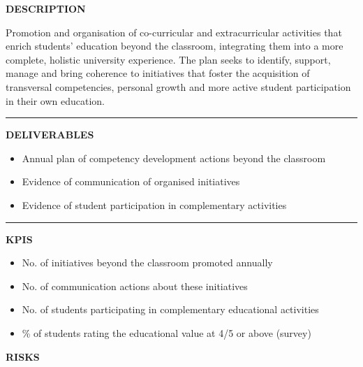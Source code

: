 \documentclass[11pt,a4paper]{scrreprt}
\newcommand{\fieldlabel}[1]{%
  {\footnotesize\sffamily\bfseries\color{mutedcolor}\MakeUppercase{#1}}\par\nopagebreak[4]
}
\newcommand{\fieldsep}{\vspace{3pt}\noindent\textcolor{bordercolor}{\rule{\linewidth}{0.4pt}}\vspace{3pt}\par}
\begin{document}
\begin{tcolorbox}[pabox={e360color}{A.P.5.1 \enspace\textbullet\enspace Promotion of Education Beyond the Classroom}]

\fieldlabel{Description}
{\small Promotion and organisation of co-curricular and extracurricular activities that enrich students' education beyond the classroom, integrating them into a more complete, holistic university experience. The plan seeks to identify, support, manage and bring coherence to initiatives that foster the acquisition of transversal competencies, personal growth and more active student participation in their own education. }\par
\fieldsep
\fieldlabel{Deliverables}
{\small \begin{itemize}[noitemsep,topsep=2pt]
\item Annual plan of competency development actions beyond the classroom
\item Evidence of communication of organised initiatives
\item Evidence of student participation in complementary activities
\end{itemize}}\par
\fieldsep
\fieldlabel{KPIs}
{\small \begin{itemize}[noitemsep,topsep=2pt]
\item No. of initiatives beyond the classroom promoted annually
\item No. of communication actions about these initiatives
\item No. of students participating in complementary educational activities
\item \% of students rating the educational value at 4/5 or above (survey)
\end{itemize}}\par
\end{tcolorbox}
\begin{tcolorbox}[riskbox]
{\footnotesize\sffamily\bfseries\color{red!50!black} RISKS}\par{}
\end{tcolorbox}
\end{document}
